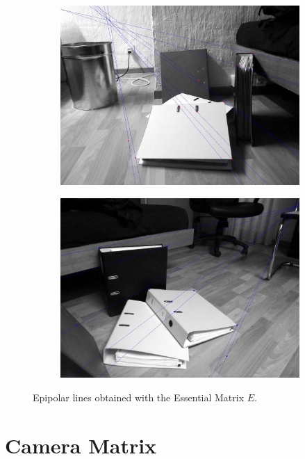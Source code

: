 \documentclass{ethz_report}
\begin{document}
\begin{figure}[H]
\centering
\begin{subfigure}[b]{.5\textwidth}
  \centering
  \includegraphics[width=1\linewidth]{images/ematrix_1}
\end{subfigure}%
\begin{subfigure}[b]{.5\textwidth}
  \centering
  \includegraphics[width=1\linewidth]{images/ematrix_2}
\end{subfigure}
\caption{Epipolar lines obtained with the Essential Matrix $E$.}
\label{fig:es_mat}
\end{figure}

\section*{Camera Matrix}
\end{document}
